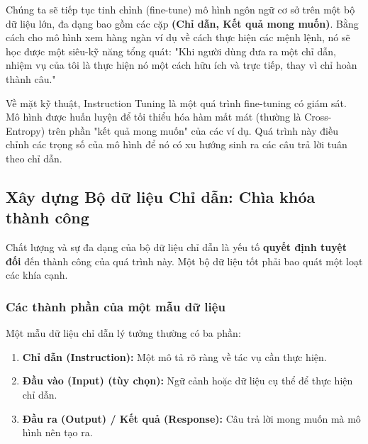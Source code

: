 \begin{tcolorbox}[
    title=Triết lý của Instruction Tuning,
    colback=green!5!white, colframe=green!60!black, fonttitle=\bfseries
]
Chúng ta sẽ tiếp tục tinh chỉnh (fine-tune) mô hình ngôn ngữ cơ sở trên một bộ dữ liệu lớn, đa dạng bao gồm các cặp \textbf{(Chỉ dẫn, Kết quả mong muốn)}. Bằng cách cho mô hình xem hàng ngàn ví dụ về cách thực hiện các mệnh lệnh, nó sẽ học được một siêu-kỹ năng tổng quát: "Khi người dùng đưa ra một chỉ dẫn, nhiệm vụ của tôi là thực hiện nó một cách hữu ích và trực tiếp, thay vì chỉ hoàn thành câu."
\end{tcolorbox}

Về mặt kỹ thuật, Instruction Tuning là một quá trình fine-tuning có giám sát. Mô hình được huấn luyện để tối thiểu hóa hàm mất mát (thường là Cross-Entropy) trên phần "kết quả mong muốn" của các ví dụ. Quá trình này điều chỉnh các trọng số của mô hình để nó có xu hướng sinh ra các câu trả lời tuân theo chỉ dẫn.

\subsection{Xây dựng Bộ dữ liệu Chỉ dẫn: Chìa khóa thành công}
\label{ssec:instruction_dataset_building}

Chất lượng và sự đa dạng của bộ dữ liệu chỉ dẫn là yếu tố \textbf{quyết định tuyệt đối} đến thành công của quá trình này. Một bộ dữ liệu tốt phải bao quát một loạt các khía cạnh.

\subsubsection{Các thành phần của một mẫu dữ liệu}
Một mẫu dữ liệu chỉ dẫn lý tưởng thường có ba phần:
\begin{enumerate}
    \item \textbf{Chỉ dẫn (Instruction):} Một mô tả rõ ràng về tác vụ cần thực hiện.
    \item \textbf{Đầu vào (Input) (tùy chọn):} Ngữ cảnh hoặc dữ liệu cụ thể để thực hiện chỉ dẫn.
    \item \textbf{Đầu ra (Output) / Kết quả (Response):} Câu trả lời mong muốn mà mô hình nên tạo ra.
\end{enumerate}

